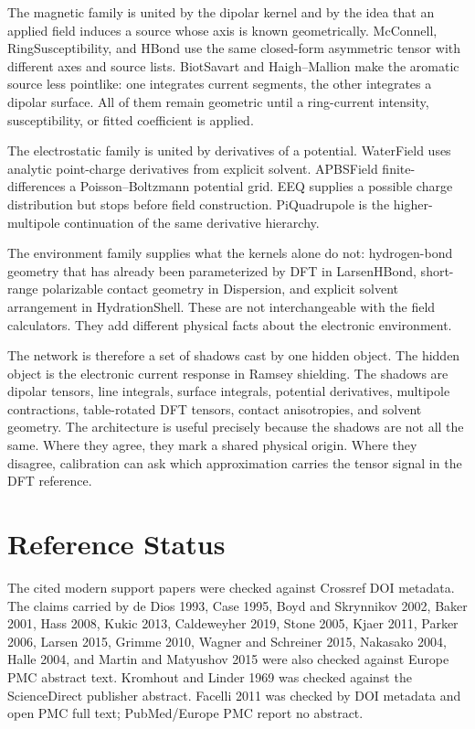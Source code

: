 \documentclass[11pt]{article}
\begin{document}
The magnetic family is united by the dipolar kernel and by the idea that an
applied field induces a source whose axis is known geometrically. McConnell,
RingSusceptibility, and HBond use the same closed-form asymmetric tensor with
different axes and source lists. BiotSavart and Haigh--Mallion make the aromatic
source less pointlike: one integrates current segments, the other integrates a
dipolar surface. All of them remain geometric until a ring-current intensity,
susceptibility, or fitted coefficient is applied.

The electrostatic family is united by derivatives of a potential. WaterField
uses analytic point-charge derivatives from explicit solvent. APBSField
finite-differences a Poisson--Boltzmann potential grid. EEQ supplies a possible
charge distribution but stops before field construction. PiQuadrupole is the
higher-multipole continuation of the same derivative hierarchy.

The environment family supplies what the kernels alone do not: hydrogen-bond
geometry that has already been parameterized by DFT in LarsenHBond, short-range
polarizable contact geometry in Dispersion, and explicit solvent arrangement in
HydrationShell. These are not interchangeable with the field calculators. They
add different physical facts about the electronic environment.

The network is therefore a set of shadows cast by one hidden object. The hidden
object is the electronic current response in Ramsey shielding. The shadows are
dipolar tensors, line integrals, surface integrals, potential derivatives,
multipole contractions, table-rotated DFT tensors, contact anisotropies, and
solvent geometry. The architecture is useful precisely because the shadows are
not all the same. Where they agree, they mark a shared physical origin. Where
they disagree, calibration can ask which approximation carries the tensor signal
in the DFT reference.

\section{Reference Status}

The cited modern support papers were checked against Crossref DOI metadata. The
claims carried by de Dios 1993, Case 1995, Boyd and Skrynnikov 2002, Baker
2001, Hass 2008, Kukic 2013, Caldeweyher 2019, Stone 2005, Kjaer 2011, Parker
2006, Larsen 2015, Grimme 2010, Wagner and Schreiner 2015, Nakasako 2004,
Halle 2004, and Martin and Matyushov 2015 were also checked against Europe PMC
abstract text. Kromhout and Linder 1969 was checked against the ScienceDirect
publisher abstract. Facelli 2011 was checked by DOI metadata and open PMC full
text; PubMed/Europe PMC report no abstract.
\end{document}

